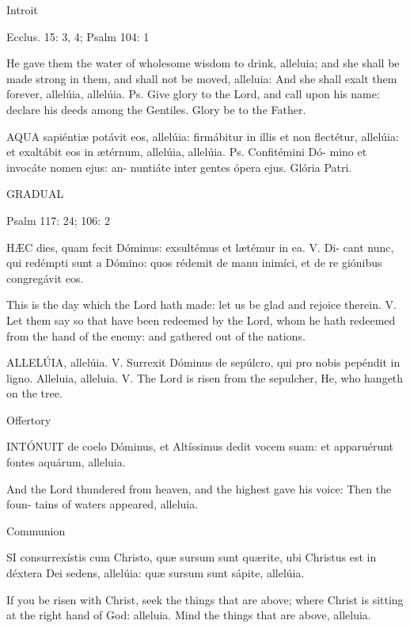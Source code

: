 Introit

Ecclus. 15: 3, 4; Psalm 104: 1 

He  gave  them  the  water  of  wholesome  
wisdom  to  drink,  alleluia;  and  she  shall  be  
made  strong  in  them,  and  shall  not  be  
moved,  alleluia:  And  she  shall  exalt  them  
forever,  allelúia,  allelúia.  Ps.  Give  glory  to  
the  Lord,  and  call  upon  his  name:  declare  
his deeds among the Gentiles. Glory be to 
the Father. 

AQUA sapiéntiæ potávit eos, allelúia: 
firmábitur  in  illis  et  non  flectétur,  
allelúia:  et  exaltábit  eos  in  ætérnum,  
allelúia, allelúia. Ps. Confitémini Dó-
mino  et  invocáte  nomen  ejus:  an-
nuntiáte   inter   gentes   ópera   ejus.   
Glória Patri. 



GRADUAL 

Psalm 117: 24; 106: 2 

HÆC  dies,   quam   fecit   Dóminus:   
exsultémus  et  lætémur  in  ea.  V.  Di-
cant   nunc,   qui   redémpti   sunt   a   
Dómino:   quos   rédemit   de   manu   
inimíci, et de re
giónibus congregávit 
eos.
 
This is the day which the Lord hath made: 
let  us  be  glad  and  rejoice  therein.  V.    Let  
them  say  so  that  have  been  redeemed  by  
the  Lord,  whom  he  hath  redeemed  from  
the  hand  of  the  enemy:  and  gathered  out  
of the nations. 

ALLELÚIA,    allelúia.    V.    Surrexit    
Dóminus de sepúlcro, qui pro nobis 
pepéndit in ligno. 
Alleluia, alleluia. V. The Lord is risen from 
the  sepulcher,  He,  who  hangeth on the tree.

Offertory

INTÓNUIT  de   coelo   Dóminus,   et   
Altíssimus   dedit   vocem   suam:   et   
apparuérunt  fontes  aquárum,  alleluia.

And the Lord thundered from heaven, and 
the highest gave his voice: Then the foun-
tains of waters appeared, alleluia. 

Communion

SI  consurrexístis  cum  Christo,  quæ  
sursum  sunt  quærite,  ubi  Christus  
est  in  déxtera  Dei  
sedens,  allelúia:  
quæ sursum sunt sápite, allelúia. 

If you be risen with Christ, seek the things 
that  are  above;  where  Christ  is  sitting  at  
the  right  hand  of  God:  alleluia.  Mind  the  
things that are above, alleluia. 

